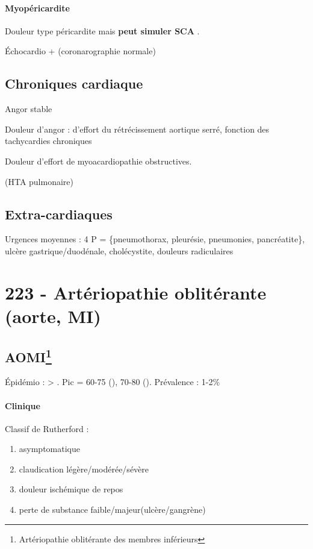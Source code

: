 \paragraph{Myopéricardite}
Douleur type péricardite mais \textbf{peut simuler SCA} .

Échocardio + (coronarographie normale)

\subsection{Chroniques cardiaque}
Angor stable

Douleur d'angor : d'effort du rétrécissement aortique serré, fonction des
tachycardies chroniques

Douleur d'effort de myoacardiopathie obstructives.

(HTA pulmonaire)

\subsection{Extra-cardiaques}
Urgences moyennes : 4 P = \{pneumothorax, pleurésie,
pneumonies, pancréatite\}, ulcère gastrique/duodénale, cholécystite, douleurs
radiculaires

\section{223 - Artériopathie oblitérante (aorte, MI)}%
\label{sec:223_arteriopathie_obliterante_aorte_mi_}
\subsection{AOMI\footnote{Artériopathie oblitérante des membres inférieurs}}

Épidémio : \male > \female. Pic = 60-75 (\male), 70-80 (\female). Prévalence :
1-2\%

\paragraph{Clinique}
Classif de Rutherford : 
\begin{enumerate}[label=\Roman*]
  \item asymptomatique 
  \item claudication légère/modérée/sévère
  \item douleur ischémique de repos 
  \item perte de substance faible/majeur(ulcère/gangrène)
\end{enumerate}

